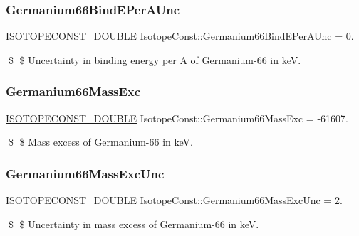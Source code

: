 \subsubsection{\texorpdfstring{Germanium66\+Bind\+E\+Per\+A\+Unc}{Germanium66BindEPerAUnc}}
{\footnotesize\ttfamily \mbox{\hyperlink{group___isotope_const-_macros_ga8f45a7272ce02c0b4c65c44636ed719a}{I\+S\+O\+T\+O\+P\+E\+C\+O\+N\+S\+T\+\_\+\+D\+O\+U\+B\+LE}} Isotope\+Const\+::\+Germanium66\+Bind\+E\+Per\+A\+Unc = 0.}

\$ \$ Uncertainty in binding energy per A of Germanium-\/66 in keV. \mbox{\label{group___isotope_const-_germanium-_ge66_ga85a098c3a211c5774fc1c790a7eca160}} 
\subsubsection{\texorpdfstring{Germanium66\+Mass\+Exc}{Germanium66MassExc}}
{\footnotesize\ttfamily \mbox{\hyperlink{group___isotope_const-_macros_ga8f45a7272ce02c0b4c65c44636ed719a}{I\+S\+O\+T\+O\+P\+E\+C\+O\+N\+S\+T\+\_\+\+D\+O\+U\+B\+LE}} Isotope\+Const\+::\+Germanium66\+Mass\+Exc = -\/61607.}

\$ \$ Mass excess of Germanium-\/66 in keV. \mbox{\label{group___isotope_const-_germanium-_ge66_ga832d2a741809eb2fdf70a2b471445452}} 
\subsubsection{\texorpdfstring{Germanium66\+Mass\+Exc\+Unc}{Germanium66MassExcUnc}}
{\footnotesize\ttfamily \mbox{\hyperlink{group___isotope_const-_macros_ga8f45a7272ce02c0b4c65c44636ed719a}{I\+S\+O\+T\+O\+P\+E\+C\+O\+N\+S\+T\+\_\+\+D\+O\+U\+B\+LE}} Isotope\+Const\+::\+Germanium66\+Mass\+Exc\+Unc = 2.}

\$ \$ Uncertainty in mass excess of Germanium-\/66 in keV. \mbox{\label{group___isotope_const-_germanium-_ge66_ga456696fd33ad0aa26ec985e68cd5ae44}} 
